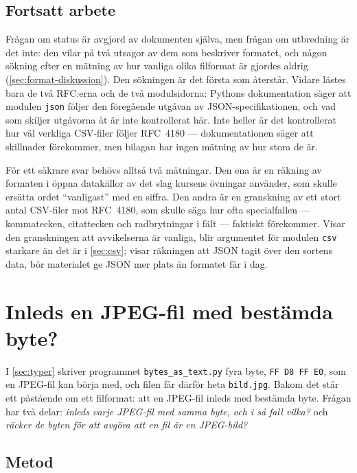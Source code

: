 \section{Fortsatt arbete}
\label{sec:format-fortsatt}

Frågan om status är avgjord av dokumenten själva, men frågan om
utbredning är det inte: den vilar på två utsagor av dem som beskriver
formatet, och någon sökning efter en mätning av hur vanliga olika
filformat är gjordes aldrig (\cref{sec:format-diskussion}).  Den
sökningen är det första som återstår.  Vidare lästes bara de två
RFC:erna och de två modulsidorna: Pythons dokumentation säger att
modulen \texttt{json} följer den föregående utgåvan av
JSON-specifikationen, och vad som skiljer utgåvorna åt är inte
kontrollerat här.  Inte heller är det kontrollerat hur väl verkliga
CSV-filer följer RFC~4180 --- dokumentationen säger att skillnader
förekommer, men bilagan har ingen mätning av hur stora de är.

För ett säkrare svar behövs alltså två mätningar.  Den ena är en
räkning av formaten i öppna datakällor av det slag kursens övningar
använder, som skulle ersätta ordet \enquote{vanligast} med en siffra.
Den andra är en granskning av ett stort antal CSV-filer mot RFC~4180,
som skulle säga hur ofta specialfallen --- kommatecken, citattecken och
radbrytningar i fält --- faktiskt förekommer.  Visar den granskningen
att avvikelserna är vanliga, blir argumentet för modulen
\texttt{csv} starkare än det är i \cref{sec:csv}; visar
räkningen att JSON tagit över den sortens data, bör materialet ge JSON
mer plats än formatet får i dag.


\chapter{Inleds en JPEG-fil med bestämda byte?}
\label{app:jpeg}

I \cref{sec:typer} skriver programmet \texttt{bytes\_as\_text.py} fyra
byte, \texttt{FF D8 FF E0}, som en JPEG-fil kan börja med, och filen
får därför heta \texttt{bild.jpg}.  Bakom det står ett påstående om ett
filformat: att en JPEG-fil inleds med bestämda byte.  Frågan har två
delar: \emph{inleds varje JPEG-fil med samma byte, och i så fall vilka?}
och \emph{räcker de byten för att avgöra att en fil är en JPEG-bild?}

\section{Metod}
\label{sec:jpeg-metod}

